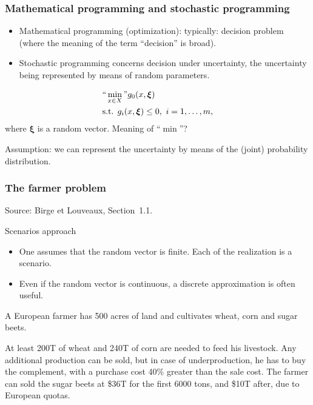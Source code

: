 \documentclass{beamer}
\def\bxi{\boldsymbol\xi}
\def\blue{\color{blue}}
\def\red{\color{red}}
\begin{document}
\begin{frame}
\frametitle{Mathematical programming and stochastic programming}

\begin{itemize}
\item
{\red Mathematical programming} (optimization): typically: decision problem (where the meaning of the term ``decision'' is broad).
\item
{\red Stochastic programming} concerns decision under uncertainty, the uncertainty being represented by means of random parameters.
\end{itemize}
\[
\begin{split}
& ``\min_{x \in X}" g_0(x,\bxi) \\
& \text{s.t. }g_i(x, \bxi) \leq 0,\ i=1,\ldots{},m,\\
\end{split}
\]
where $\bxi$ is a random vector. Meaning of ``$\min$''?

\mbox{}

{\red Assumption}: we can represent the uncertainty by means of the (joint) probability distribution.

\end{frame}

\begin{frame}
\frametitle{The farmer problem}

Source: Birge et Louveaux, Section~1.1.

\mbox{}

{\blue Scenarios approach}
\begin{itemize}
\item
One assumes that the random vector is finite. Each of the realization is a scenario.
\item
Even if the random vector is continuous, a discrete approximation is often useful.
\end{itemize}

\mbox{}

A European farmer has 500 acres of land and cultivates wheat, corn and sugar beets.

\mbox{}

At least 200T of wheat and 240T of corn are needed to feed his livestock.
Any additional production can be sold, but in case of underproduction, he has to buy the complement, with a purchase cost 40\% greater than the sale cost.
The farmer can sold the sugar beets at \$36T for the first 6000 tons, and \$10T after, due to European quotas.

\end{frame}
\end{document}
